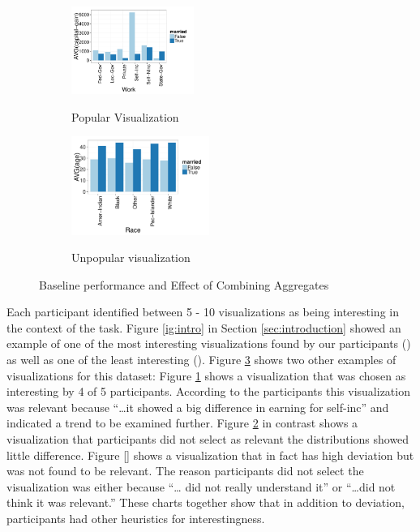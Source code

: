 \begin{figure}[t]
	\centering
	\begin{subfigure}{0.45\linewidth}
		{\includegraphics[width=4cm, trim=0 0 3cm 0, clip=true] {Images/HUHI_work_avg_cap_gain.pdf}}
		\caption{Popular Visualization}
		\label{fig:popular}  
	\end{subfigure}
	\begin{subfigure}{0.54\linewidth}
		{\includegraphics[width=4.5cm] {Images/LULI_race_avg_age.pdf}}
		\caption{Unpopular visualization}
		\label{fig:not_popular}
	\end{subfigure}
	\vspace{-10pt}
	\caption{Baseline performance and Effect of Combining Aggregates }
	\vspace{-10pt}
	\label{fig:gt_examples}
\end{figure} 

Each participant identified between 5 - 10 visualizations as being interesting
in the context of the task.
Figure \ref{ig:intro} in Section \ref{sec:introduction} showed an example of one of the most interesting
visualizations found by our participants () as well as one of the least interesting
(). 
Figure \ref{fig:gt_examples} shows two other examples of visualizations for this
dataset: Figure \ref{fig:popular} 
shows a visualization that was chosen as interesting by 4 of 5 participants.
According to the participants this visualization was relevant because ``\ldots it
showed a big difference in earning for self-inc'' and indicated a trend to 
be examined further.
Figure \ref{fig:not_popular} in contrast shows a visualization that participants
did not select as relevant the distributions showed little difference. 
Figure \ref{} shows a visualization that in fact has high deviation but was not 
found to be relevant. 
The reason participants did not select the visualization was either because ``\ldots
did not really understand it'' or ``\ldots did not think it was relevant.''
These charts together show that in addition to deviation, participants had other
heuristics for interestingness.

